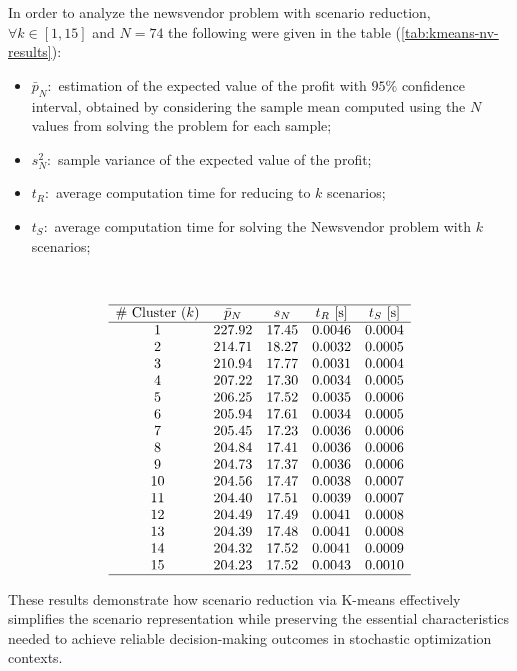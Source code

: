 \documentclass[a4paper,12pt]{article}
\begin{document}
	In order to analyze the newsvendor problem with scenario reduction, $\forall k \in [1,15]$ and $N = 74$ the following were given in the table (\ref{tab:kmeans-nv-results}):
	\begin{itemize}
		\item $\bar{p}_{N}:$ estimation of the expected value of the profit with $95\%$ confidence interval, obtained by considering the sample mean computed using the $N$ values from solving the problem for each sample; 
		\item $s^{2}_{N}:$ sample variance of the expected value of the profit;
		\item $t_{R}:$ average computation time for reducing to $k$ scenarios;
		\item $t_{S}:$ average computation time for solving the Newsvendor problem with $k$ scenarios;
	\end{itemize}~
	
	\[
	\begin{array}{ccccc}
		\hline
		\text{\# Cluster $(k)$} & \text{$\bar{p}_{N}$} & \text{$s_{N}$} & \text{$t_{R}$ [s]} & \text{$t_{S}$ [s]} \\
		\hline
		1 & 227.92 & 17.45 & 0.0046 & 0.0004 \\
		2 & 214.71 & 18.27 & 0.0032 & 0.0005 \\
		3 & 210.94 & 17.77 & 0.0031 & 0.0004 \\
		4 & 207.22 & 17.30 & 0.0034 & 0.0005 \\
		5 & 206.25 & 17.52 & 0.0035 & 0.0006 \\
		6 & 205.94 & 17.61 & 0.0034 & 0.0005 \\
		7 & 205.45 & 17.23 & 0.0036 & 0.0006 \\
		8 & 204.84 & 17.41 & 0.0036 & 0.0006 \\
		9 & 204.73 & 17.37 & 0.0036 & 0.0006 \\
		10 & 204.56 & 17.47 & 0.0038 & 0.0007 \\
		11 & 204.40 & 17.51 & 0.0039 & 0.0007 \\
		12 & 204.49 & 17.49 & 0.0041 & 0.0008 \\
		13 & 204.39 & 17.48 & 0.0041 & 0.0008 \\
		14 & 204.32 & 17.52 & 0.0041 & 0.0009 \\
		15 & 204.23 & 17.52 & 0.0043 & 0.0010 \\
		\hline
	\end{array}
	\]
	
	
	\noindent These results demonstrate how scenario reduction via K-means effectively simplifies the scenario representation while preserving the essential characteristics needed to achieve reliable decision-making outcomes in stochastic optimization contexts.\\
	
\end{document}
